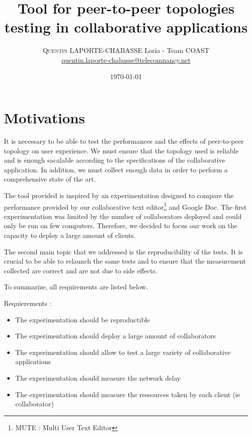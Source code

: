 \documentclass[twoside,twocolumn]{article}
\title{Tool for peer-to-peer topologies testing in collaborative applications} %
\author{
\textsc{Quentin LAPORTE-CHABASSE}
\normalsize Loria - Team COAST \\ %
\normalsize \href{mailto:quentin.laporte-chabasse@telecomnancy.net}{quentin.laporte-chabasse@telecomnancy.net} %
}
\date{\today}
\begin{document}
\maketitle


\section{Motivations}

It is necessary to be able to test the performances and the effects of peer-to-peer topology on user experience.
We must ensure that the topology used is reliable and is enough sacalable according to the specifications of the collaborative application.
In addition, we must collect enough data in order to perform a comprehensive state of the art.

The tool provided is inspired by an experimentation designed to compare the performance provided by our collaborative text editor\footnote{MUTE : Multi User Text Editor} and Google Doc.
The first experimentation was limited by the number of collaborators deployed and could only be run on few computers. Therefore, we decided to focus our work on the capacity to deploy a
large amount of clients.

The second main topic that we addressed is the reproducibility of the tests. It is crucial to be able to relaunch the same tests and to ensure that the measurement collected are correct
and are not due to side effects.

To summarize, all requirements are listed below.

Requierements :
\begin{itemize}
  \item The experimentation should be reproductible
  \item The experimentation should deploy a large amount of collaborators
  \item The experimentation should allow to test a large variety of collaborative applications
  \item The experimentation should measure the network delay
  \item The experimentation should measure the ressources taken by each client (ie collaborator)
\end{itemize}
\end{document}
